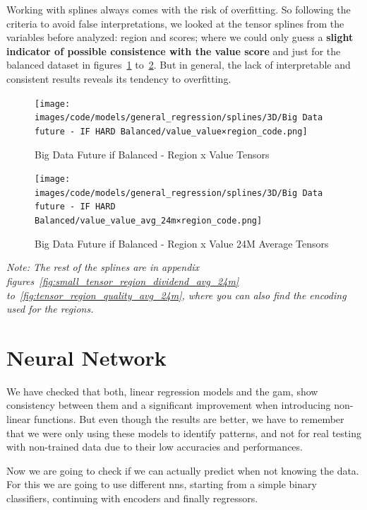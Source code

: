 \documentclass[11pt,english,a4paper,hidelinks]{book}
\begin{document}
\noindent Working with splines always comes with the risk of overfitting. So following the criteria to avoid false interpretations, we looked at the tensor splines from the variables before analyzed:  region and scores; where we could only guess a \textbf{slight indicator of possible consistence with the value score} and just for the balanced dataset in figures~\ref{fig:tensor_region_value} to~\ref{fig:tensor_region_value_avg_24m}. But in general, the lack of interpretable and consistent results reveals its tendency to overfitting.

\begin{figure}[H]
    \centering
    \texttt{[image: images/code/models/general\_regression/splines/3D/Big Data future - IF HARD Balanced/value\_value×region\_code.png]}
    \caption{Big Data Future \acrshort{if} Balanced -  Region x Value Tensors}
    \label{fig:tensor_region_value}
\end{figure}

\begin{figure}[H]
    \centering
    \texttt{[image: images/code/models/general\_regression/splines/3D/Big Data future - IF HARD Balanced/value\_value\_avg\_24m×region\_code.png]}
    \caption{Big Data Future \acrshort{if} Balanced -  Region x Value 24M Average Tensors}
    \label{fig:tensor_region_value_avg_24m}
\end{figure}

\noindent \textit{Note: The rest of the splines are in appendix figures~\ref{fig:small_tensor_region_dividend_avg_24m} to~\ref{fig:tensor_region_quality_avg_24m}, where you can also find the encoding used for the regions.}

\section{Neural Network}

We have checked that both, linear regression models and the \acrshort{gam}, show consistency between them and a significant improvement when introducing non-linear functions. But even though the results are better, we have to remember that we were only using these models to identify patterns, and not for real testing with non-trained data due to their low accuracies and performances.

\vspace{0.5cm}

\noindent Now we are going to check if we can actually predict when not knowing the data. For this we are going to use different \acrshort{nn}s, starting from a simple binary classifiers, continuing with encoders and finally regressors.
\end{document}
